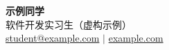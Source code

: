 \begin{center}
  \textbf{\Huge 示例同学} \\[5pt]
  软件开发实习生（虚构示例） \\[3pt]
  \href{mailto:student@example.com}{student@example.com} $|$ \href{https://example.com}{example.com}
\end{center}
